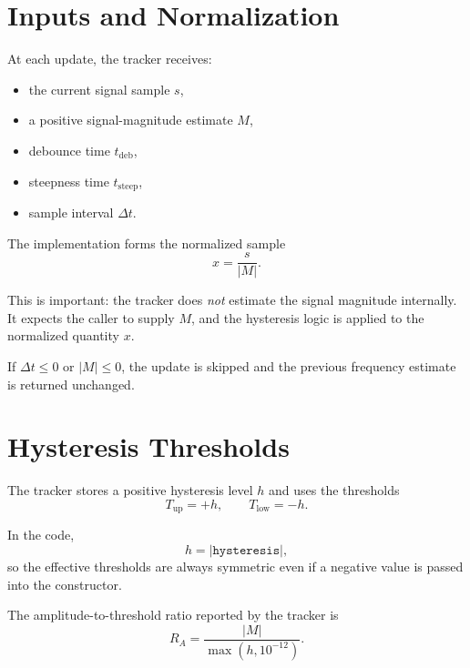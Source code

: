 \documentclass[conference]{IEEEtran}
\begin{document}
\section{Inputs and Normalization}

At each update, the tracker receives:
\begin{itemize}[leftmargin=1.4em]
  \item the current signal sample \(s\),
  \item a positive signal-magnitude estimate \(M\),
  \item debounce time \(t_{\mathrm{deb}}\),
  \item steepness time \(t_{\mathrm{steep}}\),
  \item sample interval \(\Delta t\).
\end{itemize}

The implementation forms the normalized sample
\begin{equation}
  x = \frac{s}{|M|}.
\end{equation}

This is important: the tracker does \emph{not} estimate the signal magnitude
internally. It expects the caller to supply \(M\), and the hysteresis logic is
applied to the normalized quantity \(x\).

If \(\Delta t \le 0\) or \(|M| \le 0\), the update is skipped and the previous
frequency estimate is returned unchanged.

\section{Hysteresis Thresholds}

The tracker stores a positive hysteresis level \(h\) and uses the thresholds
\begin{equation}
  T_{\mathrm{up}} = +h,
  \qquad
  T_{\mathrm{low}} = -h.
\end{equation}

In the code,
\begin{equation}
  h = |\texttt{hysteresis}|,
\end{equation}
so the effective thresholds are always symmetric even if a negative value is
passed into the constructor.

The amplitude-to-threshold ratio reported by the tracker is
\begin{equation}
  R_A = \frac{|M|}{\max(h,10^{-12})}.
\end{equation}
\end{document}

